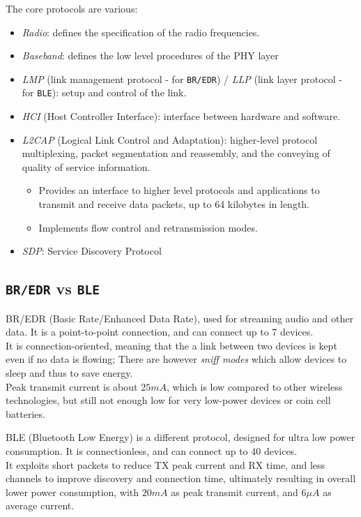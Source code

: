 
The core protocols are various:
\begin{itemize}
   \item \textit{Radio}: defines the specification of the radio frequencies.
   \item \textit{Baseband}: defines the low level procedures of the PHY layer
   \item \textit{LMP} (link management protocol - for \texttt{BR/EDR}) / \textit{LLP} (link layer protocol - for \texttt{BLE}): setup and control of the link.
   \item \textit{HCI} (Host Controller Interface): interface between hardware and software.
   \item \textit{L2CAP} (Logical Link Control and Adaptation): higher-level protocol multiplexing,
   packet segmentation and reassembly, and the conveying of quality of service information.
   \begin{itemize}
      \item Provides an interface to higher level protocols and applications to transmit and receive data packets, up
      to 64 kilobytes in length.
      \item Implements flow control and retransmission modes.
   \end{itemize}
   \item \textit{SDP}: Service Discovery Protocol
\end{itemize}

\subsection{\texttt{BR/EDR} vs \texttt{BLE}}
BR/EDR (Basic Rate/Enhanced Data Rate), used for streaming audio and other data. It is a point-to-point connection, and can connect up to 7 devices.\\
It is connection-oriented, meaning that the a link between two devices is kept even if no data is flowing;
There are however \textit{sniff modes} which allow devices to sleep and thus to save energy.\\
Peak transmit current is about $25mA$, which is low compared to other wireless technologies, but still not enough low for very low-power devices or coin cell batteries.
\nl

BLE (Bluetooth Low Energy) is a different protocol, designed for ultra low power consumption. It is connectionless, and can connect up to 40 devices.\\
It exploits short packets to reduce TX peak current and RX time, and less channels to improve discovery and connection time, ultimately resulting in overall lower power consumption, with $20mA$ as peak transmit current, and $6\mu A$ as average current.

